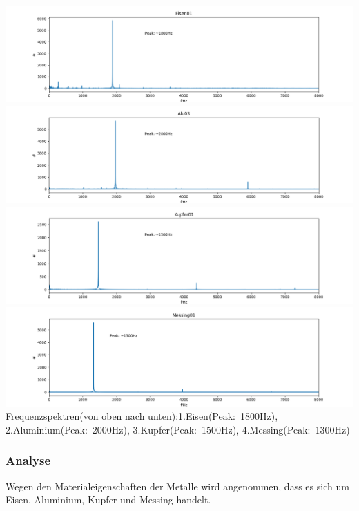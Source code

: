 \documentclass[12pt,a4paper]{article}
\begin{document}
\includegraphics[width=\linewidth,height=\textheight,keepaspectratio]{Bilder/Eisen01_fourier.png}\\
\includegraphics[width=\linewidth,height=\textheight,keepaspectratio]{Bilder/Alu03_fourier.png}\\
\includegraphics[width=\linewidth,height=\textheight,keepaspectratio]{Bilder/Kupfer01_fourier.png}\\
\includegraphics[width=\linewidth,height=\textheight,keepaspectratio]{Bilder/Messing01_fourier.png}\\
Frequenzspektren(von oben nach unten):1.Eisen(Peak:~1800Hz), 2.Aluminium(Peak:~2000Hz), 3.Kupfer(Peak:~1500Hz), 4.Messing(Peak:~1300Hz)
\newpage
\subsubsection{Analyse}
Wegen den Materialeigenschaften der Metalle wird angenommen, dass es sich um Eisen, Aluminium, Kupfer und Messing handelt.
\end{document}
